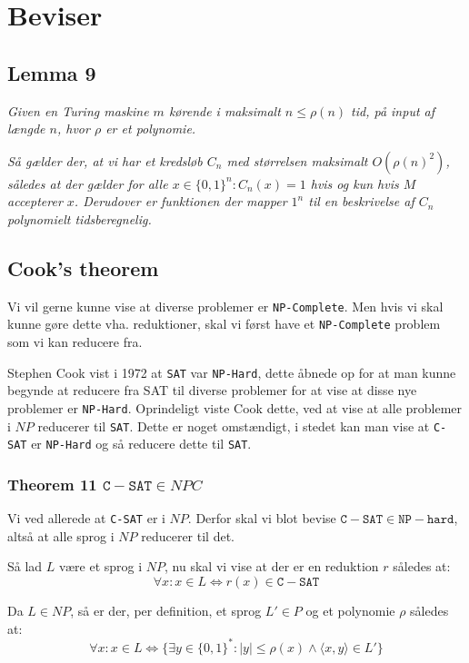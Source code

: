\documentclass[danish,a4paper,article,12pt]{article}
\begin{document}
\section{Beviser}

\subsection{Lemma 9}
\emph{Given en Turing maskine $m$ kørende i maksimalt $n \leq \rho(n)$ tid, på input af længde $n$, hvor $\rho$ er et polynomie.}

\emph{Så gælder der, at vi har et kredsløb $C_n$ med størrelsen maksimalt $O(\rho(n)^2)$, således at der gælder for alle $x\in \{0,1\}^n : C_n(x)=1$ hvis og kun hvis $M$ accepterer $x$. Derudover er funktionen der mapper $1^n$ til en beskrivelse af $C_n$ polynomielt tidsberegnelig. }


\subsection{Cook's theorem}
Vi vil gerne kunne vise at diverse problemer er \texttt{NP-Complete}. Men hvis vi skal kunne gøre dette vha. reduktioner, skal vi først have et \texttt{NP-Complete} problem som vi kan reducere fra.

Stephen Cook vist i 1972 at \texttt{SAT} var \texttt{NP-Hard}, dette åbnede op for at man kunne begynde at reducere fra SAT til diverse problemer for at vise at disse nye problemer er \texttt{NP-Hard}. Oprindeligt viste Cook dette, ved at vise at alle problemer i $NP$ reducerer til \texttt{SAT}. Dette er noget omstændigt, i stedet kan man vise at \texttt{C-SAT} er \texttt{NP-Hard} og så reducere dette til \texttt{SAT}.

\subsubsection{Theorem 11 $\mathtt{C-SAT} \in NPC$}
Vi ved allerede at \texttt{C-SAT} er i $NP$. Derfor skal vi blot bevise $\mathtt{C-SAT} \in \mathtt{NP-hard}$, altså at alle sprog i $NP$ reducerer til det.

Så lad $L$ være et sprog i $NP$, nu skal vi vise at der er en reduktion $r$ således at:
\begin{equation}
\forall x : x \in L \Leftrightarrow r(x) \in \mathtt{C-SAT}
\end{equation}

Da $L\in NP$, så er der, per definition, et sprog $L'\in P$ og et polynomie $\rho$ således at:
\begin{equation}
\forall x : x \in L \Leftrightarrow \{\exists y \in \{0,1\}^* : |y| \leq \rho(x) \wedge \langle x,y \rangle \in L' \}
\end{equation}
\end{document}

